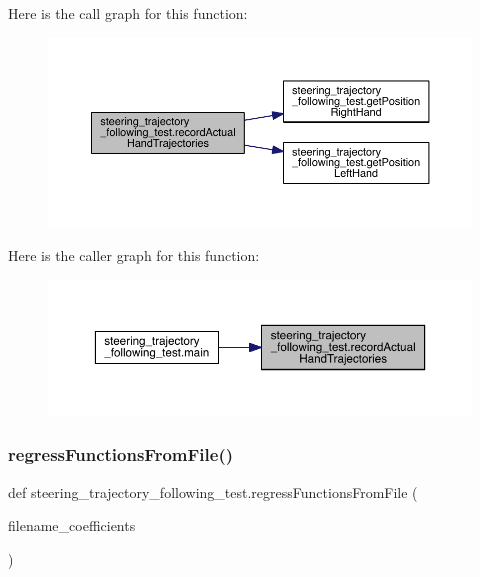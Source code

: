 Here is the call graph for this function\+:\nopagebreak
\begin{figure}[H]
\begin{center}
\leavevmode
\includegraphics[width=350pt]{namespacesteering__trajectory__following__test_a143549e166bd92e4c144e7fd9f9194bb_cgraph}
\end{center}
\end{figure}
Here is the caller graph for this function\+:\nopagebreak
\begin{figure}[H]
\begin{center}
\leavevmode
\includegraphics[width=350pt]{namespacesteering__trajectory__following__test_a143549e166bd92e4c144e7fd9f9194bb_icgraph}
\end{center}
\end{figure}
\mbox{\label{namespacesteering__trajectory__following__test_a09ce0e9b50241eec3bb69e5362b69159}} 
\subsubsection{\texorpdfstring{regressFunctionsFromFile()}{regressFunctionsFromFile()}}
{\footnotesize\ttfamily def steering\+\_\+trajectory\+\_\+following\+\_\+test.\+regress\+Functions\+From\+File (\begin{DoxyParamCaption}\item[{}]{filename\+\_\+coefficients }\end{DoxyParamCaption})}



